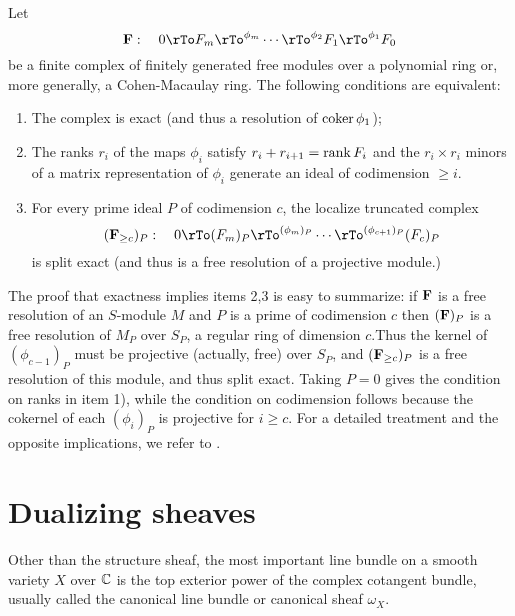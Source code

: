 \begin{theorem}\label{WMACE} Let 
$$
{\bf F}:  \quad 0\rTo F_m\rTo^{\phi_m} \cdots\rTo^{\phi_2} F_1\rTo^{\phi_1} F_0
$$
be a finite complex of finitely generated free modules over a polynomial ring or, more generally, a Cohen-Macaulay ring. The following conditions are equivalent:
\begin{enumerate}

\item The complex is exact (and thus a resolution of $\coker \phi_1$);

\item The ranks $r_i$ of the maps $\phi_i$ satisfy $r_i+r_{i+1}  = \rank F_i$ and the $r_i\times r_i$ minors of a matrix representation of
$\phi_i$ generate an ideal of codimension $\geq i$.

\item For every prime ideal $P$ of codimension $c$, the localize truncated complex 
$$
({\bf F}_{\geq c})_P: \quad 0\rTo (F_m)_P\rTo^{(\phi_m)_P} \cdots\rTo^{(\phi_{c+1})_P} (F_c)_P
$$
is split exact (and thus is a free resolution of a projective module.)
\end{enumerate}
\end{theorem}

The proof that exactness implies items 2,3 is easy to summarize: if ${\bf F}$ is a free resolution of an $S$-module $M$ and $P$ is a prime of codimension $c$
then $({\bf F})_P$ is a free resolution of
$M_P$ over $S_P$, a regular ring of dimension $c$.Thus the kernel of $(\phi_{c-1})_P$ must be projective (actually, free) over $S_P$, 
and $({\bf F}_{\geq c})_P$ is a free resolution of this module, and thus split exact. Taking $P = 0$ gives the condition on ranks in
item 1), while the condition on codimension follows because the cokernel of each $(\phi_i)_P$ is projective for $i\geq c$. For a detailed treatment and the opposite implications, we refer to \cite{book}.

\section {Dualizing sheaves} 

\def\HH{{H}}

Other than  the structure sheaf, the most important line bundle on a smooth variety   $X$ over $\CC$ is the top exterior power of the complex cotangent bundle, usually called the canonical line bundle or canonical sheaf $\omega_{X}$. 

